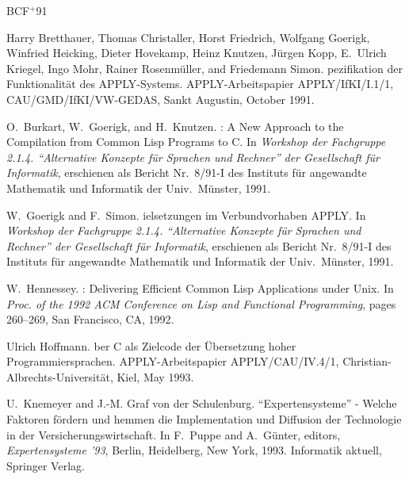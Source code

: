 \newcommand{\etalchar}[1]{$^{#1}$}
\begin{thebibliography}{BCF{\etalchar{+}}91}

\bibitem[BCF{\etalchar{+}}91]{APPLY/IfKI/I.1/1}
Harry Bretthauer, Thomas Christaller, Horst Friedrich, Wolfgang Goerigk,
  Winfried Heicking, Dieter Hovekamp, Heinz Knutzen, J\"urgen Kopp, E.~Ulrich
  Kriegel, Ingo Mohr, Rainer Rosenm\"uller, and Friedemann Simon.
pezifikation der {F}unktionalit\"at des {APPLY}-{S}ystems.
\newblock APPLY-Arbeitspapier APPLY/IfKI/I.1/1, CAU/GMD/IfKI/VW-GEDAS, Sankt
  Augustin, October 1991.

O.~Burkart, W.~Goerigk, and H.~Knutzen.
: {A} {N}ew {A}pproach to the {C}ompilation from {C}ommon
  {L}isp {P}rograms to {C}.
\newblock In {\em Work\-shop der Fachgruppe 2.1.4. {\sl ``Alternative Konzepte
  f\"ur Sprachen und Rechner''} der Gesellschaft f\"ur Informatik}, erschienen
  als Bericht Nr.\ 8/91-I des Instituts f\"ur angewandte Mathematik und
  Informatik der Univ.\ M\"unster, 1991.

W.~Goerigk and F.~Simon.
ielsetzungen im {V}erbundvorhaben {APPLY}.
\newblock In {\em Work\-shop der Fachgruppe 2.1.4. {\sl ``Alternative Konzepte
  f\"ur Sprachen und Rechner''} der Gesellschaft f\"ur Informatik}, erschienen
  als Bericht Nr.\ 8/91-I des Instituts f\"ur angewandte Mathematik und
  Informatik der Univ.\ M\"unster, 1991.

W.~Hennessey.
: {D}elivering {E}fficient {C}ommon {L}isp {A}pplications under
  {U}nix.
\newblock In {\em Proc. of the 1992 ACM Conference on Lisp and Functional
  Programming}, pages 260--269, San Francisco, CA, 1992.

Ulrich Hoffmann.
ber {C} als {Z}ielcode der {\"U}bersetzung hoher
  {P}rogrammiersprachen.
\newblock APPLY-Arbeitspapier APPLY/CAU/IV.4/1,
  Christian-Albrechts-Universit\"at, Kiel, May 1993.

U.~Knemeyer and {J.-M.} {Graf von der Schulenburg}.
\newblock ``{E}xpertensysteme'' - {W}elche {F}aktoren f\"ordern und hemmen die
  {I}mplementation und {D}iffusion der {T}echnologie in der
  {V}ersicherungswirtschaft.
\newblock In F.~Puppe and A.~G\"unter, editors, {\em Expertensysteme '93},
  Berlin, Heidelberg, New York, 1993. Informatik aktuell, Springer Verlag.


\end{thebibliography}

